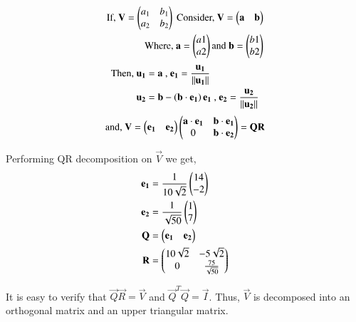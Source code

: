 \begin{align}
\text{If, } \mathbf{V} = \begin{pmatrix}a_1  & b_1 \\ a_2 & b_2\end{pmatrix} 
\text{ Consider, } \mathbf{V} = \begin{pmatrix}\mathbf{a} & \mathbf{b}\end{pmatrix} \nonumber \\
\text{Where, } \mathbf{a} = \begin{pmatrix}a1 \\ a2\end{pmatrix} \text{and } \mathbf{b} = \begin{pmatrix}b1 \\ b2\end{pmatrix} 
\end{align}
\begin{align}
\text{Then, } \mathbf{u_1} &= \mathbf{a} \text{ , } \mathbf{e_1} = \frac{\mathbf{u_1}}{\left\lVert\mathbf{u_1}\right\rVert}  \nonumber \\
\mathbf{u_2} &= \mathbf{b} - \left(\mathbf{b}\cdot\mathbf{e_1}\right)\mathbf{e_1} \text{ , } \mathbf{e_2} = \frac{\mathbf{u_2}}{\left\lVert\mathbf{u_2}\right\rVert} 
\end{align}
\begin{align}
\text{and, } \mathbf{V} = \begin{pmatrix}\mathbf{e_1} & \mathbf{e_2}\end{pmatrix}\begin{pmatrix}\mathbf{a}\cdot\mathbf{e_1} & \mathbf{b}\cdot\mathbf{e_1} \\ 0 & \mathbf{b}\cdot\mathbf{e_2}\end{pmatrix} = \mathbf{Q}\mathbf{R}
\end{align}

Performing QR decomposition on $\vec{V}$ we get,
\begin{align}
\mathbf{e_1} &= \frac{1}{10\sqrt{2}}\begin{pmatrix}14 \\ -2\end{pmatrix}  \\
\mathbf{e_2} &= \frac{1}{\sqrt{50}}\begin{pmatrix}1 \\ 7\end{pmatrix}  \\
\mathbf{Q} &= \begin{pmatrix}\mathbf{e_1} & \mathbf{e_2}\end{pmatrix} \\
\mathbf{R} &= \begin{pmatrix}10\sqrt{2} & -5\sqrt{2} \\ 0 & \frac{75}{\sqrt{50}}\end{pmatrix} 
\end{align}

It is easy to verify that $\vec{Q}\vec{R} = \vec{V}$ and $\vec{Q}^T\vec{Q} = \vec{I}$. Thus, $\vec{V}$  is decomposed into an orthogonal matrix and an upper triangular matrix.
